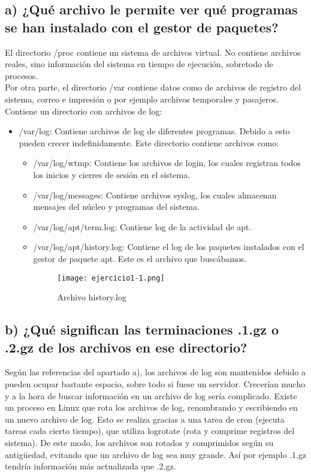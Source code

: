 	\subsection{a) ¿Qué archivo le permite ver qué programas se han instalado con el gestor de paquetes?}
	
	El directorio /proc\cite{ejercicio1-1,ejercicio1-2,ejercicio1-3} contiene un sistema de archivos virtual. No contiene archivos reales, sino información del sistema en tiempo de ejecución, sobretodo de procesos.
	\\
	
	Por otra parte, el directorio /var\cite{ejercicio1-4,ejercicio1-5} contiene datos como de archivos de registro del sistema, correo e impresión o por ejemplo archivos temporales y pasajeros. Contiene un directorio con archivos de log:
	\begin{itemize}
		\item /var/log: Contiene archivos de log de diferentes programas. Debido a esto pueden crecer indefinidamente. Este directorio contiene archivos como:
		\begin{itemize}
			\item /var/log/wtmp: Contiene los archivos de login, los cuales registran todos los inicios y cierres de sesión en el sistema.
			\item /var/log/messages: Contiene archivos syslog, los cuales almacenan mensajes del núcleo y programas del sistema.
			\item /var/log/apt/term.log\cite{ejercicio1-6}: Contiene log de la actividad de apt.
			\item /var/log/apt/history.log\cite{ejercicio1-7,ejercicio1-8}: Contiene el log de los paquetes instalados con el gestor de paquete apt. Este es el archivo que buscábamos.
			\begin{figure}[H] 
				\centering
				\texttt{[image: ejercicio1-1.png]} 
				\label{figura1} 
				\caption{Archivo history.log}
			\end{figure} 
		\end{itemize} 
	\end{itemize}

	
	\subsection{b) ¿Qué significan las terminaciones .1.gz o .2.gz de los archivos en ese directorio?}
	
	Según las referencias del apartado a), los archivos de log son mantenidos debido a pueden ocupar bastante espacio, sobre todo si fuese un servidor. Crecerían mucho y a la hora de buscar información en un archivo de log sería complicado. Existe un proceso en Linux que rota los archivos de log, renombrando y escribiendo en un nuevo archivo de log. Esto se realiza gracias a una tarea de cron\cite{ejercicio1-9} (ejecuta tareas cada cierto tiempo), que utiliza logrotate\cite{ejercicio1-10} (rota y comprime registros del sistema). De este modo, los archivos son rotados y comprimidos según su antigüedad, evitando que un archivo de log sea muy grande. Así por ejemplo .1.gz tendría información más actualizada que .2.gz.
	\\
	
